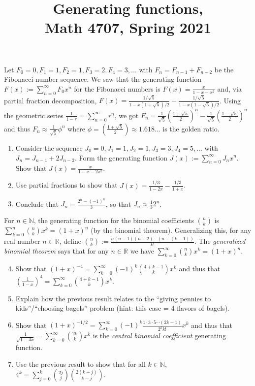 \documentclass[11pt]{article}
\title{Generating functions, \\Math 4707, Spring 2021}
\date{}
\begin{document}
\maketitle

\thispagestyle{empty}

\vspace{-0.5cm}

Let $F_0=0,F_1=1,F_2=1,F_3=2,F_4=3,...$ with $F_{n} = F_{n-1} + F_{n-2}$ be the Fibonacci number sequence. We saw that the generating function $F(x) := \sum_{n=0}^{\infty}F_0 x^n$ for the Fibonacci numbers is $F(x) = \frac{x}{1-x-x^2}$ and, via partial fraction decomposition, $F(x) = \frac{ 1/\sqrt{5}}{1- x(1+\sqrt{5})/2} - \frac{ 1/\sqrt{5}}{1- x(1-\sqrt{5})/2}$. Using the geometric series $\frac{1}{1-r}= \sum_{n=0}^{\infty}r^n$, we got $F_n = \frac{1}{\sqrt{5}}(\frac{1+\sqrt{5}}{2})^n - \frac{1}{\sqrt{5}}(\frac{1-\sqrt{5}}{2})^n$ and thus $F_n \approx \frac{1}{\sqrt{5}}\phi^n$ where $\phi =(\frac{1+\sqrt{5}}{2})\approx 1.618...$ is the golden ratio.

\begin{enumerate}
\item Consider the sequence $J_0=0, J_1=1, J_2=1, J_3=3, J_4=5, ...$ with $J_{n}=J_{n-1}+2J_{n-2}$. Form the generating function $J(x) := \sum_{n=0}^{\infty} J_n x^n$. Show that $J(x) = \frac{x}{1-x-2x^2}$.
\item Use partial fractions to show that $J(x) = \frac{1/3}{1-2x} - \frac{1/3}{1+x}$.
\item Conclude that $J_n = \frac{2^n-(-1)^n}{3}$, so that $J_n \approx \frac{1}{3}2^n$.
\end{enumerate}

For $n \in \mathbb{N}$, the generating function for the binomial coefficients $\binom{n}{k}$ is $\sum_{k=0}^{n} \binom{n}{k} x^k = (1+x)^n$ (by the binomial theorem). Generalizing this, for any real number $n \in \mathbb{R}$, define $\binom{n}{k} := \frac{n(n-1)(n-2)...(n-(k-1))}{k!}$. The \emph{generalized binomial theorem} says that for any $n \in \mathbb{R}$ we have $\sum_{k=0}^{\infty} \binom{n}{k} x^k = (1+x)^n$.



\begin{enumerate}
\setcounter{enumi}{3}
\item Show that $(1+x)^{-4} = \sum_{k=0}^{\infty} (-1)^k \binom{4+k-1}{k} x^k$ and thus that $\left(\frac{1}{1-x}\right)^4 = \sum_{k=0}^{\infty} \binom{4+k-1}{k} x^k$. 

\item Explain how the previous result relates to the ``giving pennies to kids''/``choosing bagels'' problem (hint: this case = 4 flavors of bagels).

\item Show that $(1+x)^{-1/2} = \sum_{k=0}^{\infty}(-1)^k \frac{1 \cdot 3 \cdot 5 \cdots (2k-1)}{2^k k!} x^k$ and thus that $\frac{1}{\sqrt{1-4x}} =  \sum_{k=0}^{\infty} \binom{2k}{k}x^k$ is the \emph{central binomial coefficient} generating function.

\item Use the previous result to show that for all $k \in \mathbb{N}$, $4^k = \sum_{j=0}^{k} \binom{2j}{j} \binom{2(k-j)}{k-j}$.

\end{enumerate}
\end{document}
